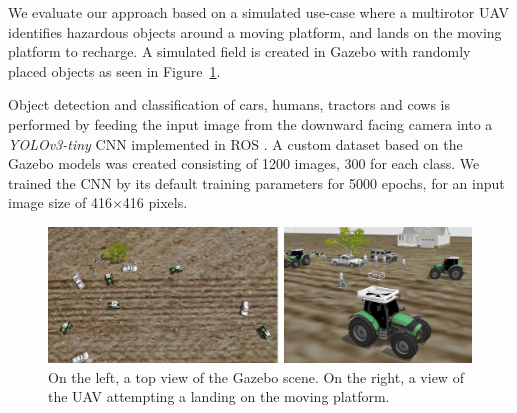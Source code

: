 \documentclass[conference]{IEEEtran}
\begin{document}
We evaluate our approach based on a simulated use-case where a multirotor UAV identifies
hazardous objects around a moving platform, and lands on the
moving platform to recharge. A simulated field is created in Gazebo with randomly placed objects as seen in Figure~\ref{fig:Gazebo}.

Object detection and classification of cars, humans, tractors and cows is performed by feeding the input
image from the downward facing camera into a \emph{YOLOv3-tiny} CNN
\cite{yolov3} implemented in ROS \cite{bjelonicYolo2018}. 
A custom dataset based on the Gazebo models was created consisting of 1200 images, 300
for each class. We trained the CNN by its default training
parameters for 5000 epochs, for an input image size of \SI{416}{}$\times$\SI{416}{}
pixels.

\begin{figure}[t]
\centering
\includegraphics[scale=0.2]{gazebo_scalled_gamma_corrected.png}
\caption{On the left, a top view of the Gazebo scene. 
On the right, a view of the UAV attempting a landing on the moving platform.}
\label{fig:Gazebo}
\end{figure}





\end{document}

